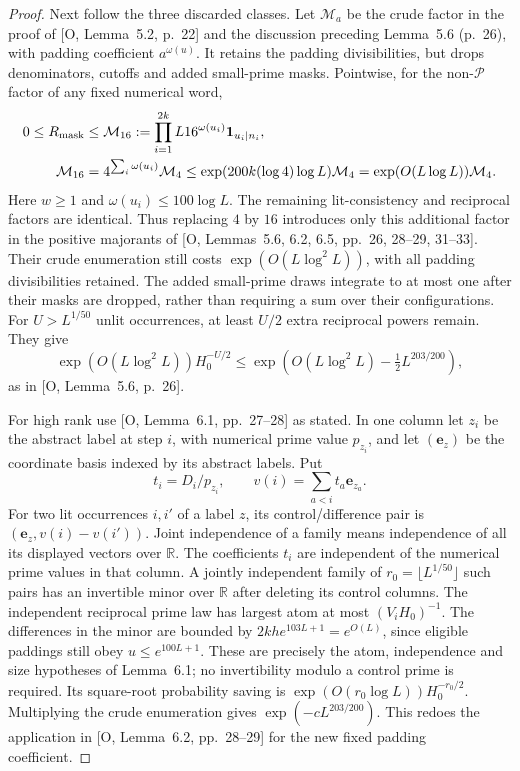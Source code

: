 \documentclass[11pt]{article}
\theoremstyle{definition}
\newcommand{\R}{\mathbb R}
\newcommand{\ind}{\mathbf 1}
\newcommand{\Pset}{\mathcal P}
\theoremstyle{remark}
\numberwithin{equation}{section}
\begin{document}
\begin{proof}
Next follow the three discarded classes. Let $\mathcal M_a$ be the crude factor in the proof of
[O, Lemma~5.2, p.~22] and the discussion preceding Lemma~5.6 (p.~26), with padding coefficient $a^{\omega(u)}$.
It retains the padding divisibilities, but drops denominators, cutoffs and added small-prime masks. Pointwise,
for the non-$\Pset$ factor of any fixed numerical word,
\begin{equation}\label{eq:crude-domination}
\begin{aligned}
 0\le R_{\rm mask}
 &\le\mathcal M_{16}:=\prod_{i=1}^{2k}L16^{\omega(u_i)}\ind_{u_i\mid n_i},\\
 \mathcal M_{16}
 &=4^{\sum_i\omega(u_i)}\mathcal M_4
 \le\exp(200k(\log4)\log L)\mathcal M_4
 =\exp(O(L\log L))\mathcal M_4.
\end{aligned}
\end{equation}
Here $w\ge1$ and $\omega(u_i)\le100\log L$. The remaining lit-consistency and reciprocal factors are identical.
Thus replacing $4$ by $16$ introduces only this additional factor in the positive majorants of
[O, Lemmas~5.6, 6.2, 6.5, pp.~26, 28--29, 31--33]. Their crude enumeration still costs
$\exp(O(L\log^2L))$, with all padding divisibilities retained. The added small-prime draws integrate to at most
one after their masks are dropped, rather than requiring a sum over their configurations.
For $U>L^{1/50}$ unlit occurrences, at least $U/2$ extra reciprocal powers remain. They give
\begin{equation}\label{eq:unlit-cost}
 \exp(O(L\log^2L))H_0^{-U/2}
 \le\exp(O(L\log^2L)-\tfrac12L^{203/200}),
\end{equation}
as in [O, Lemma~5.6, p.~26].

For high rank use [O, Lemma~6.1, pp.~27--28] as stated. In one column let $z_i$ be the abstract label at step $i$,
with numerical prime value $p_{z_i}$, and let $(\mathbf e_z)$ be the coordinate basis indexed by its abstract labels. Put
\[
 t_i=D_i/p_{z_i},\qquad v(i)=\sum_{a<i}t_a\mathbf e_{z_a}.
\]
For two lit occurrences $i,i'$ of a label $z$, its control/difference pair is
$(\mathbf e_z,v(i)-v(i'))$. Joint independence of a family means independence of all its displayed vectors over $\R$.
The coefficients $t_i$ are independent of the numerical prime values in that column. A jointly independent family of
$r_0=\lfloor L^{1/50}\rfloor$ such pairs has an invertible minor over $\R$ after deleting its control columns.
The independent reciprocal prime law has largest atom at most $(V_iH_0)^{-1}$.
The differences in the minor are bounded by $2kh e^{103L+1}=e^{O(L)}$, since eligible paddings still obey
$u\le e^{100L+1}$. These are precisely the atom, independence and size hypotheses of Lemma~6.1; no invertibility
modulo a control prime is required. Its square-root probability saving is
$\exp(O(r_0\log L))H_0^{-r_0/2}$.
Multiplying the crude enumeration gives $\exp(-cL^{203/200})$.
This redoes the application in [O, Lemma~6.2, pp.~28--29] for the new fixed padding coefficient.


\end{proof}
\end{document}
